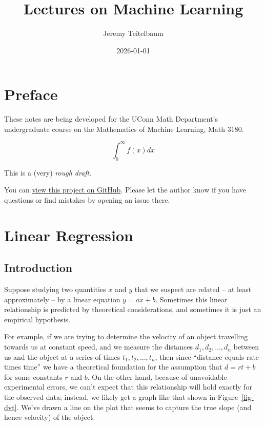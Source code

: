 \documentclass[
  11pt,
  letterpaper,
]{scrbook}
\title{Lectures on Machine Learning}
\author{Jeremy Teitelbaum}
\date{2026-01-01}
\renewcommand*\contentsname{Table of contents}
\newcommand\contentsname{Table of contents}
\theoremstyle{plain}
\theoremstyle{remark}
\begin{document}
\frontmatter
\maketitle
\ifdefined\Shaded\renewenvironment{Shaded}{\begin{tcolorbox}[borderline west={3pt}{0pt}{shadecolor}, breakable, sharp corners, interior hidden, enhanced, boxrule=0pt, frame hidden]}{\end{tcolorbox}}\fi

\renewcommand*\contentsname{Table of contents}
{
\setcounter{tocdepth}{2}
\tableofcontents
}
\mainmatter
{}

\hypertarget{preface}{%
\chapter*{Preface}\label{preface}}


These notes are being developed for the UConn Math Department's
undergraduate course on the Mathematics of Machine Learning, Math
\(3180\).

\[ \int_{0}^{\infty} f(x) dx \]

This is a (very) \emph{rough draft}.

You can
\href{https://github.com/jeremy9959/Mathematics-for-Machine-Learning}{view
this project on GitHub}. Please let the author know if you have
questions or find mistakes by opening an issue there.


\hypertarget{sec-LinearRegression}{%
\chapter{Linear Regression}\label{sec-LinearRegression}}

\hypertarget{sec-Intro}{%
\section{Introduction}\label{sec-Intro}}

Suppose studying two quantities \(x\) and \(y\) that we suspect are
related -- at least approximately -- by a linear equation \(y=ax+b\).
Sometimes this linear relationship is predicted by theoretical
considerations, and sometimes it is just an empirical hypothesis.

For example, if we are trying to determine the velocity of an object
travelling towards us at constant speed, and we measure the distances
\(d_1, d_2, \ldots, d_n\) between us and the object at a series of times
\(t_1, t_2, \ldots, t_n\), then since ``distance equals rate times
time'' we have a theoretical foundation for the assumption that
\(d=rt+b\) for some constants \(r\) and \(b\). On the other hand,
because of unavoidable experimental errors, we can't expect that this
relationship will hold exactly for the observed data; instead, we likely
get a graph like that shown in Figure~\ref{fig-dvt}. We've drawn a line
on the plot that seems to capture the true slope (and hence velocity) of
the object.
\end{document}

